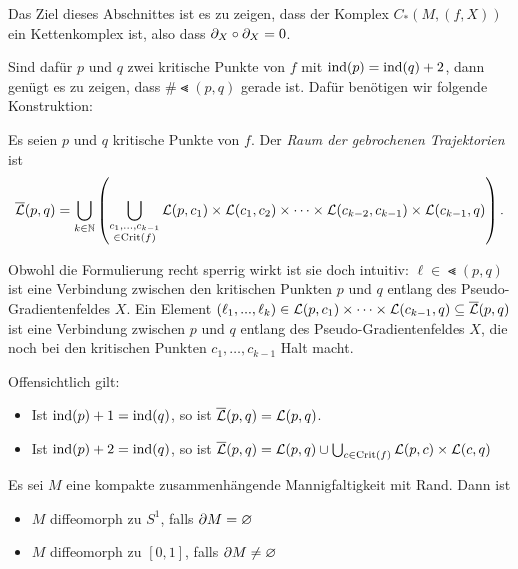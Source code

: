 Das Ziel dieses Abschnittes ist es zu zeigen, dass der Komplex $C_{\ast}(M, (f, X))$ ein Kettenkomplex
ist, also dass ${ \partial }_X \circ { \partial }_X = 0$. 

Sind dafür $p$ und $q$ zwei kritische Punkte von $f$ mit ${ \operatorname{ind} } (p) = { \operatorname{ind} } (q) + 2$, dann genügt es 
zu zeigen, dass $\# \Lt (p, q)$ gerade ist. Dafür benötigen wir folgende Konstruktion:

\begin{definition}
    \label{def: raum der gebrochenen trajektorien}
    Es seien $p$ und $q$ kritische Punkte von $f$. Der \textit{Raum der gebrochenen Trajektorien} ist
    \[ {\overline{\mathcal{L}} } (p, q) = 
        \bigcup_{k \in { \mathbb N }} \left( \bigcup_{\substack{c_1, \dots, c_{k - 1} \\ \in { \operatorname{Crit} }(f)}} 
            { \mathcal{L} } (p, c_1) \times { \mathcal{L} } (c_1, c_2) \times \dots 
                \times { \mathcal{L} } (c_{k - 2}, c_{k - 1}) \times { \mathcal{L} } (c_{k - 1}, q) \right) . \]
\end{definition}

Obwohl die Formulierung recht sperrig wirkt ist sie doch intuitiv: 
$\ell \in \Lt (p, q)$ ist eine \glqq Verbindung\grqq{} zwischen den kritischen Punkten $p$ und $q$ 
entlang des Pseudo-Gradientenfeldes $X$. Ein Element 
$(\ell_1, ..., \ell_k) \in { \mathcal{L} } (p, c_1) \times \dots \times { \mathcal{L} } (c_{k - 1}, q) \subseteq {\overline{\mathcal{L}} } (p, q)$
ist eine \glqq Verbindung\grqq{} zwischen $p$ und $q$ entlang des Pseudo-Gradientenfeldes $X$, die noch 
bei den kritischen Punkten $c_1, \dots, c_{k - 1}$ \glqq Halt\grqq{} macht. 

Offensichtlich gilt:
\begin{itemize}
    \item Ist ${ \operatorname{ind} } (p) + 1 = { \operatorname{ind} } (q)$, so ist ${\overline{\mathcal{L}} } (p, q) = { \mathcal{L} } (p, q)$.
    \item Ist ${ \operatorname{ind} } (p) + 2 = { \operatorname{ind} } (q)$, so ist 
        ${\overline{\mathcal{L}} } (p, q) = { \mathcal{L} } (p, q) \cup \bigcup_{c \in { \operatorname{Crit} } (f)} { \mathcal{L} }(p, c) \times { \mathcal{L} }(c, q)$
\end{itemize}

\begin{theorem}
    Es sei $M$ eine kompakte zusammenhängende Mannigfaltigkeit mit Rand. Dann ist
    \begin{itemize}
        \item $M$ diffeomorph zu $S^1$, falls ${ \partial } M = \varnothing$
        \item $M$ diffeomorph zu $[0, 1]$, falls ${ \partial } M \neq \varnothing$
    \end{itemize}
\end{theorem}

